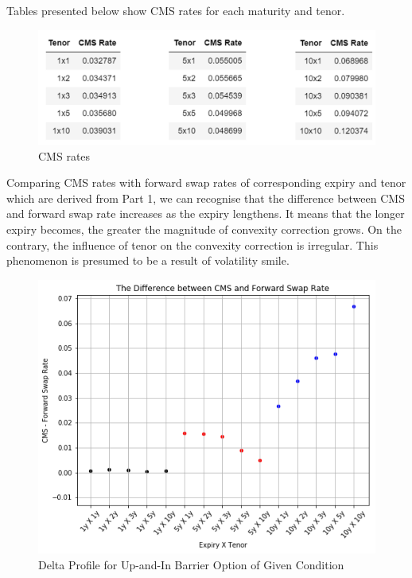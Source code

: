 \documentclass{article}
\begin{document}
	Tables presented below show CMS rates for each maturity and tenor. 
	
	\begin{figure}[h]
		\centering
		\includegraphics[scale=0.5]{CMS_RATE.png}
		\caption{CMS rates}
	\end{figure}
	
	\pagebreak
	
	 \noindent Comparing CMS rates with forward swap rates of corresponding expiry and tenor which are derived from Part 1, we can recognise that the difference between CMS and forward swap rate increases as the expiry lengthens. It means that the longer expiry becomes, the greater the magnitude of convexity correction grows. On the contrary, the influence of tenor on the convexity correction is irregular. This phenomenon is presumed to be a result of volatility smile. 

	\begin{figure}[ht]
		\centering
		\includegraphics[scale=0.5]{CMS_FSR.png}
		\caption{Delta Profile for Up-and-In Barrier Option of Given Condition}
	\end{figure}
\end{document}
